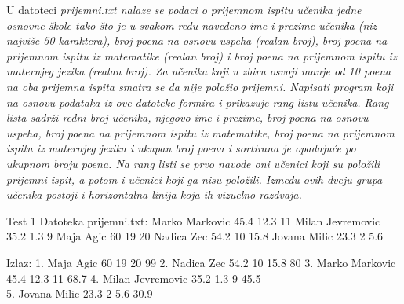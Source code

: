 \begin{Exercise}[label=705]
U datoteci \em{prijemni.txt} nalaze se podaci o prijemnom ispitu učenika jedne osnovne škole tako što je u svakom redu navedeno ime i prezime učenika (niz najviše 50 karaktera), broj poena na osnovu uspeha (realan broj), broj poena na prijemnom ispitu iz matematike (realan broj) i broj poena na prijemnom ispitu iz maternjeg jezika (realan broj). Za učenika koji u zbiru osvoji manje od 10 poena na oba prijemna ispita smatra se da nije položio prijemni. Napisati program koji na osnovu podataka iz ove datoteke formira i prikazuje rang listu učenika. Rang lista sadrži redni broj učenika, njegovo ime i prezime, broj poena na osnovu uspeha, broj poena na prijemnom ispitu iz matematike, broj poena na prijemnom ispitu iz maternjeg jezika i ukupan broj poena i sortirana je opadajuće po ukupnom broju poena. Na rang listi se prvo navode oni učenici koji su položili prijemni ispit, a potom i učenici koji ga nisu položili. Između ovih dveju grupa učenika postoji i horizontalna linija koja ih vizuelno razdvaja. 
\begin{maxitest}
\begin{test}{Test 1}
Datoteka prijemni.txt:
Marko Markovic 45.4 12.3 11         
Milan Jevremovic 35.2 1.3 9         
Maja Agic 60 19 20                  
Nadica Zec 54.2 10 15.8             
Jovana Milic 23.3 2 5.6

Izlaz:
1. Maja Agic 60 19 20 99
2. Nadica Zec 54.2 10 15.8 80
3. Marko Markovic 45.4 12.3 11 68.7
4. Milan Jevremovic 35.2 1.3 9 45.5
-----------------------------------
5. Jovana Milic 23.3 2 5.6 30.9
\end{test}
\end{maxitest}
\end{Exercise}
\begin{Answer}[ref=705]
\end{Answer}


